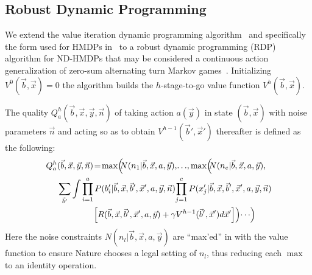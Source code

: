 \documentclass[letterpaper]{article}
\begin{document}
 
\subsection{Robust Dynamic Programming}

We extend the value iteration dynamic programming
algorithm~\cite{bellman} and specifically the form used for HMDPs
in~\cite{sdp_aaai} to a robust dynamic programming (RDP) algorithm for
ND-HMDPs that may be considered a continuous action generalization of
zero-sum alternating turn Markov games~\cite{littman94}.  Initializing
$V^0(\vec{b},\vec{x}) = 0$ the algorithm builds the $h$-stage-to-go
value function $V^h(\vec{b},\vec{x})$.

The quality $Q_a^{h}(\vec{b},\vec{x},\vec{y},\vec{n})$ of taking
action $a(\vec{y})$ in state $(\vec{b},\vec{x})$ with noise parameters
$\vec{n}$ and acting so as to obtain $V^{h-1}(\vec{b}',\vec{x}')$ thereafter 
is defined as the following:
{\footnotesize
\begin{align}
Q_a^{h}&(\vec{b},\vec{x},\vec{y},\vec{n}) \! = \!
\max\!\Big(\!\!N(n_1|\vec{b},\vec{x},a,\vec{y}),\!\ldots\!, \max\!\Big(\!\!N(n_e|\vec{b},\vec{x},a,\vec{y}), \nonumber \\
& 
\sum_{\vec{b}'} \int \prod_{i=1}^a P(b_i'|\vec{b},\vec{x},\vec{b}',\vec{x}',a,\vec{y},\vec{n}) \!
\prod_{j=1}^c P(x_j'|\vec{b},\vec{x},\vec{b}',\vec{x}',a,\vec{y},\vec{n}) \! \nonumber \\
& \qquad \qquad \; \Big[ R(\vec{b},\vec{x},\vec{b}',\vec{x}',a,\vec{y}) + \gamma V^{h-1}(\vec{b}',\vec{x}') d\vec{x}' \Big] \Big) \! \cdots \! \Big) \hspace{-2mm} \label{eq:qfun}
\end{align}}
Here the noise constraints $N(n_l|\vec{b},\vec{x},a,\vec{y})$ are ``max'ed''
in with the value function to ensure Nature chooses a legal setting 
of $n_l$, thus reducing each $\max$ to an identity operation.  
\end{document}
